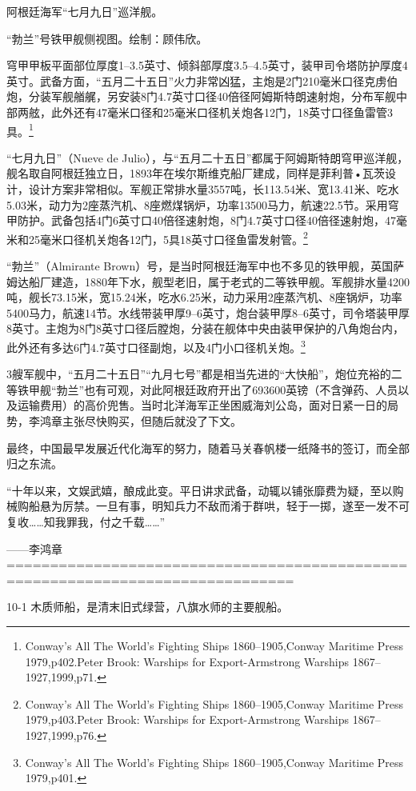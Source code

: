 \documentclass[12pt,UTF8]{ctexbook}
\begin{document}
阿根廷海军“七月九日”巡洋舰。

“勃兰”号铁甲舰侧视图。绘制：顾伟欣。

穹甲甲板平面部位厚度1--3.5英寸、倾斜部厚度3.5--4.5英寸，装甲司令塔防护厚度4英寸。武备方面，“五月二十五日”火力非常凶猛，主炮是2门210毫米口径克虏伯炮，分装军舰艏艉，另安装8门4.7英寸口径40倍径阿姆斯特朗速射炮，分布军舰中部两舷，此外还有47毫米口径和25毫米口径机关炮各12门，18英寸口径鱼雷管3具。\footnote{Conway's All The World's Fighting Ships 1860--1905,Conway Maritime Press 1979,p402.Peter Brook: Warships for Export-Armstrong Warships 1867--1927,1999,p71.}

“七月九日”（Nueve de Julio），与“五月二十五日”都属于阿姆斯特朗穹甲巡洋舰，舰名取自阿根廷独立日，1893年在埃尔斯维克船厂建成，同样是菲利普•瓦茨设计，设计方案非常相似。军舰正常排水量3557吨，长113.54米、宽13.41米、吃水5.03米，动力为2座蒸汽机、8座燃煤锅炉，功率13500马力，航速22.5节。采用穹甲防护。武备包括4门6英寸口40倍径速射炮，8门4.7英寸口径40倍径速射炮，47毫米和25毫米口径机关炮各12门，5具18英寸口径鱼雷发射管。\footnote{Conway's All The World's Fighting Ships 1860--1905,Conway Maritime Press 1979,p403.Peter Brook: Warships for Export-Armstrong Warships 1867--1927,1999,p76.}

“勃兰”（Almirante Brown）号，是当时阿根廷海军中也不多见的铁甲舰，英国萨姆达船厂建造，1880年下水，舰型老旧，属于老式的二等铁甲舰。军舰排水量4200吨，舰长73.15米，宽15.24米，吃水6.25米，动力采用2座蒸汽机、8座锅炉，功率5400马力，航速14节。水线带装甲厚9--6英寸，炮台装甲厚8--6英寸，司令塔装甲厚8英寸。主炮为8门8英寸口径后膛炮，分装在舰体中央由装甲保护的八角炮台内，此外还有多达6门4.7英寸口径副炮，以及4门小口径机关炮。\footnote{Conway's All The World's Fighting Ships 1860--1905,Conway Maritime Press 1979,p401.}

3艘军舰中，“五月二十五日”“九月七号”都是相当先进的“大快船”，炮位充裕的二等铁甲舰“勃兰”也有可观，对此阿根廷政府开出了693600英镑（不含弹药、人员以及运输费用）的高价兜售。当时北洋海军正坐困威海刘公岛，面对日紧一日的局势，李鸿章主张尽快购买，但随后就没了下文。

最终，中国最早发展近代化海军的努力，随着马关春帆楼一纸降书的签订，而全部归之东流。

“十年以来，文娱武嬉，酿成此变。平日讲求武备，动辄以铺张靡费为疑，至以购械购船悬为厉禁。一旦有事，明知兵力不敌而淆于群哄，轻于一掷，遂至一发不可复收……知我罪我，付之千载……”

——李鸿章
===============================================================================

10-1 木质师船，是清末旧式绿营，八旗水师的主要舰船。
\end{document}
